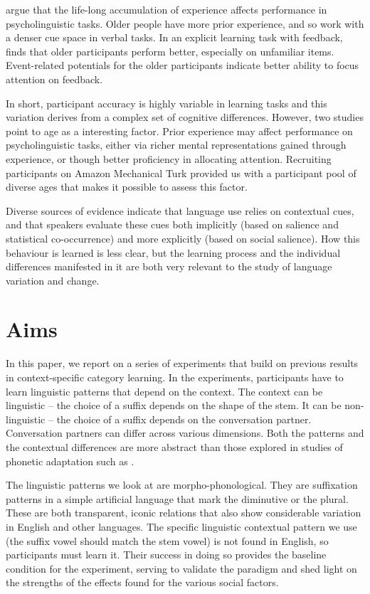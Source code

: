 \documentclass{frontiersSCNS} %
\begin{document}
\cite{ramscar2014myth} argue that the life-long accumulation of experience affects performance in psycholinguistic tasks. Older people have more prior experience, and so work with a denser cue space in verbal tasks. In an explicit learning task with feedback, \cite{metcalfe2015} finds that older participants perform better, especially on unfamiliar items. Event-related potentials for the older participants indicate better ability to focus attention on feedback. 

In short, participant accuracy is highly variable in learning tasks and this variation derives from a complex set of cognitive differences. However, two studies \citep{ramscar2014myth, metcalfe2015} point to age as a interesting factor.  Prior experience may affect performance on psycholinguistic tasks, either via richer mental representations gained through experience, or though better proficiency in allocating attention.   Recruiting participants on Amazon Mechanical Turk provided us with a participant pool of diverse ages that makes it possible to assess this factor.



Diverse sources of evidence indicate that language use relies on contextual cues, and that speakers evaluate these cues both implicitly (based on salience and statistical co-occurrence) and more explicitly (based on social salience). How this behaviour is learned is less clear, but the learning process and the individual differences manifested in it are both very relevant to the study of language variation and change.


\section{Aims}

In this paper, we report on a series of experiments that build on previous results in context-specific category learning. In the experiments, participants have to learn linguistic patterns that depend on the context. The context can be linguistic -- the choice of a suffix  depends on the shape of the stem. It can be non-linguistic -- the choice of a suffix depends on the conversation partner. Conversation partners can differ across various dimensions.  Both the patterns and the contextual differences are  more abstract than those explored in studies of phonetic adaptation such as \cite{kraljic2006generalization}.  

The linguistic patterns we look at are morpho-phonological. They are suffixation patterns in a simple artificial language that mark the diminutive or the plural. These are both transparent, iconic relations that also show considerable variation in English and other languages. The specific linguistic contextual pattern we use  (the suffix vowel should match the stem vowel) is not found in English, so participants must learn it. Their success in doing so provides the baseline condition for the experiment, serving to validate the paradigm and shed light on the strengths of the effects found for the various social factors. 
\end{document}
